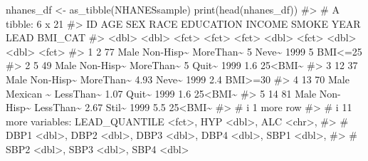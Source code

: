 \documentclass[
  letterpaper,
]{krantz}
\makeatletter
\newenvironment{Shaded}{\begin{snugshade}}{\end{snugshade}}
\newcommand{\CommentTok}[1]{\textcolor[rgb]{0.37,0.37,0.37}{#1}}
\newcommand{\FunctionTok}[1]{\textcolor[rgb]{0.28,0.35,0.67}{#1}}
\newcommand{\NormalTok}[1]{\textcolor[rgb]{0.00,0.23,0.31}{#1}}
\newcommand{\OtherTok}[1]{\textcolor[rgb]{0.00,0.23,0.31}{#1}}
\newenvironment{kframe}{%
\medskip{}
\setlength{\fboxsep}{.8em}
 \def\at@end@of@kframe{}%
 \ifinner\ifhmode%
  \def\at@end@of@kframe{\end{minipage}}%
  \begin{minipage}{\columnwidth}%
 \fi\fi%
 \def\FrameCommand##1{\hskip\@totalleftmargin \hskip-\fboxsep
 \colorbox{shadecolor}{##1}\hskip-\fboxsep
     \hskip-\linewidth \hskip-\@totalleftmargin \hskip\columnwidth}%
 \MakeFramed {\advance\hsize-\width
   \@totalleftmargin\z@ \linewidth\hsize
   \@setminipage}}%
 {\par\unskip\endMakeFramed%
 \at@end@of@kframe}
\renewenvironment{Shaded}{\begin{kframe}}{\end{kframe}}
\makeatother
\begin{document}
\begin{Shaded}
\begin{Highlighting}[]
\NormalTok{nhanes\_df }\OtherTok{\textless{}{-}} \FunctionTok{as\_tibble}\NormalTok{(NHANESsample)}
\FunctionTok{print}\NormalTok{(}\FunctionTok{head}\NormalTok{(nhanes\_df))}
\CommentTok{\#\textgreater{} \# A tibble: 6 x 21}
\CommentTok{\#\textgreater{}      ID   AGE SEX   RACE      EDUCATION INCOME SMOKE  YEAR  LEAD BMI\_CAT}
\CommentTok{\#\textgreater{}   \textless{}dbl\textgreater{} \textless{}dbl\textgreater{} \textless{}fct\textgreater{} \textless{}fct\textgreater{}     \textless{}fct\textgreater{}      \textless{}dbl\textgreater{} \textless{}fct\textgreater{} \textless{}dbl\textgreater{} \textless{}dbl\textgreater{} \textless{}fct\textgreater{}  }
\CommentTok{\#\textgreater{} 1     2    77 Male  Non{-}Hisp\textasciitilde{} MoreThan\textasciitilde{}   5    Neve\textasciitilde{}  1999   5   BMI\textless{}=25}
\CommentTok{\#\textgreater{} 2     5    49 Male  Non{-}Hisp\textasciitilde{} MoreThan\textasciitilde{}   5    Quit\textasciitilde{}  1999   1.6 25\textless{}BMI\textasciitilde{}}
\CommentTok{\#\textgreater{} 3    12    37 Male  Non{-}Hisp\textasciitilde{} MoreThan\textasciitilde{}   4.93 Neve\textasciitilde{}  1999   2.4 BMI\textgreater{}=30}
\CommentTok{\#\textgreater{} 4    13    70 Male  Mexican \textasciitilde{} LessThan\textasciitilde{}   1.07 Quit\textasciitilde{}  1999   1.6 25\textless{}BMI\textasciitilde{}}
\CommentTok{\#\textgreater{} 5    14    81 Male  Non{-}Hisp\textasciitilde{} LessThan\textasciitilde{}   2.67 Stil\textasciitilde{}  1999   5.5 25\textless{}BMI\textasciitilde{}}
\CommentTok{\#\textgreater{} \# i 1 more row}
\CommentTok{\#\textgreater{} \# i 11 more variables: LEAD\_QUANTILE \textless{}fct\textgreater{}, HYP \textless{}dbl\textgreater{}, ALC \textless{}chr\textgreater{},}
\CommentTok{\#\textgreater{} \#   DBP1 \textless{}dbl\textgreater{}, DBP2 \textless{}dbl\textgreater{}, DBP3 \textless{}dbl\textgreater{}, DBP4 \textless{}dbl\textgreater{}, SBP1 \textless{}dbl\textgreater{},}
\CommentTok{\#\textgreater{} \#   SBP2 \textless{}dbl\textgreater{}, SBP3 \textless{}dbl\textgreater{}, SBP4 \textless{}dbl\textgreater{}}
\end{Highlighting}
\end{Shaded}
\end{document}
